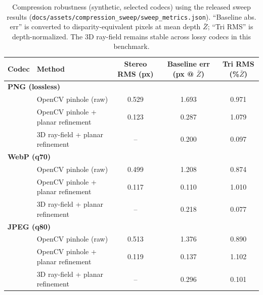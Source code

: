 \begin{table}[H]
\centering
\scriptsize
\setlength{\tabcolsep}{4pt}
\begin{tabular}{llccc}
\toprule
Codec & Method & Stereo RMS (px) & Baseline err (px @ $\bar Z$) & Tri RMS (\%$\bar Z$)\\
\midrule
\multicolumn{5}{l}{\textbf{PNG (lossless)}}\\
\quad & OpenCV pinhole (raw) & 0.529 & 1.693 & 0.971\\
\quad & OpenCV pinhole + planar refinement & 0.123 & 0.287 & 1.079\\
\quad & 3D ray-field + planar refinement & -- & 0.200 & 0.097\\
\midrule
\multicolumn{5}{l}{\textbf{WebP (q70)}}\\
\quad & OpenCV pinhole (raw) & 0.499 & 1.208 & 0.874\\
\quad & OpenCV pinhole + planar refinement & 0.117 & 0.110 & 1.010\\
\quad & 3D ray-field + planar refinement & -- & 0.218 & 0.077\\
\midrule
\multicolumn{5}{l}{\textbf{JPEG (q80)}}\\
\quad & OpenCV pinhole (raw) & 0.513 & 1.376 & 0.890\\
\quad & OpenCV pinhole + planar refinement & 0.119 & 0.137 & 1.102\\
\quad & 3D ray-field + planar refinement & -- & 0.296 & 0.101\\
\bottomrule
\end{tabular}
\caption{Compression robustness (synthetic, selected codecs) using the released sweep results (\texttt{docs/assets/compression\_sweep/sweep\_metrics.json}). ``Baseline abs. err'' is converted to disparity-equivalent pixels at mean depth $\bar Z$; ``Tri RMS'' is depth-normalized. The 3D ray-field remains stable across lossy codecs in this benchmark.}
\label{tab:compression_summary}
\end{table}
